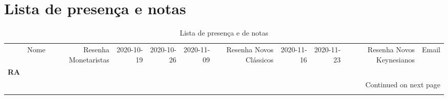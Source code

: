 \documentclass[11pt]{article}
\begin{document}
\section{Lista de presença e notas}
\label{sec:org1de0421}
\begin{center}\begin{landscape}
\small
\setlength\LTleft{0pt}
\setlength\LTright{0pt}
\begin{longtable}{llrrrrrrrrl}
\caption{Lista de presença e de notas}\label{lista}\\
\toprule
{} &                                  Nome &  Resenha Monetaristas &  2020-10-19 &  2020-10-26 &  2020-11-09 &  Resenha Novos Clássicos &  2020-11-16 &  2020-11-23 &  Resenha Novos Keynesianos &                   Email \\
\textbf{RA    } &                                       &                       &             &             &             &                          &             &             &                            &                         \\
\midrule
\endhead
\midrule
\multicolumn{11}{r}{{Continued on next page}} \\
\midrule
\endfoot


\end{longtable}
\end{landscape}
\end{center}
\end{document}

